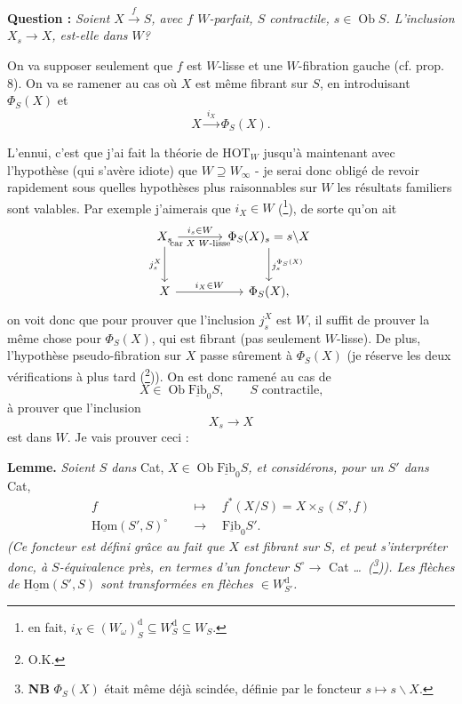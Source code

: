 \documentclass[11pt]{article}
\newcommand{\printedpage}[1]{\marginpar{\footnotesize p.~#1}}
\newcommand{\msp}[1]{\marginpar{\footnotesize [#1]}}
\newcommand{\Ob}{\operatorname{Ob}}
\newcommand{\fl}{\longrightarrow}
\newcommand{\uHom}{\underline{\mathrm{Hom}}}
\newcommand{\uFib}{\underline{\mathrm{Fib}}}
\newcommand{\HOT}{\mathrm{HOT}}
\begin{document}
\textbf{Question :} \textit{Soient $X\xrightarrow{\ f\ }S$, avec $f$ $W$-parfait, $S$ contractile, $s\in\Ob S$. L'inclusion $X_s\fl X$, est-elle dans $W$?}

\printedpage{32}
\msp{page 43}On va supposer seulement que $f$ est $W$-lisse et une $W$-fibration gauche (cf. prop. 8). On va se ramener au cas où $X$ est même fibrant sur $S$, en introduisant $\Phi_S(X)$ et %
\[ X\xrightarrow{\ i_X\ }\Phi_S(X). \]

L'ennui, c'est que j'ai fait la théorie de $\HOT_W$ jusqu'à maintenant avec l'hypothèse (qui s'avère idiote) que $W\supseteq W_\infty$ - je serai donc obligé de revoir rapidement sous quelles hypothèses plus raisonnables sur $W$ les résultats familiers sont valables. Par exemple j'aimerais que $i_X\in W$ (\footnote[50]{en fait, $i_X\in(W_\omega)^{\mathrm{d}}_S\subseteq W^{\mathrm{d}}_S\subseteq W_S$.}), de sorte qu'on ait
\[
\begin{tikzcd}[column sep=large, row sep=large]
X_s \arrow[r, "i_s\in W", "\text{car $X$ $W$-lisse}"'] \arrow[d, "j^X_s"'] & \Phi_S(X)_s=s\backslash X \arrow[d, "j_s^{\Phi_S(X)}"] \\
X \arrow[r, "i_X\in W"] & \Phi_S(X),
\end{tikzcd}
\]
on voit donc que pour prouver que l'inclusion $j^X_s$ est $W$, il suffit de prouver la même chose pour $\Phi_S(X)$, qui est fibrant (pas seulement $W$-lisse). De plus, l'hypothèse pseudo-fibration sur $X$ passe sûrement à $\Phi_S(X)$ (je réserve les deux vérifications à plus tard (\footnote[51]{O.K.})). On est donc ramené au cas de
\[ X\in\Ob\uFib_0S, \qquad S\text{ contractile,} \]
à prouver que l'inclusion
\[ X_s\fl X \]
\msp{page 44}est dans $W$. Je vais prouver ceci :

\textbf{Lemme.} \textit{Soient $S$ dans} Cat, \textit{$X\in\Ob\uFib_0S$, et considérons, pour un $S'$ dans} Cat,
\[
\begin{aligned}
f &\quad\longmapsto\quad f^*(X/S)=X\times_S(S',f)\\
\uHom(S',S)^{\circ} &\quad\longrightarrow\quad \uFib_0S'.
\end{aligned}
\]
\textit{(Ce foncteur est défini grâce au fait que $X$ est fibrant sur $S$, et peut s'interpréter donc, à $S$-équivalence près, en termes d'un foncteur $S^{\circ}\fl$} Cat \textit{\dots\ (\footnote[52]{\textbf{NB} $\Phi_S(X)$ était même déjà scindée, définie par le foncteur $s\longmapsto s\backslash X$.})). Les flèches de $\uHom(S',S)$ sont transformées en flèches $\in W^{\mathrm{d}}_{S'}$.}
\end{document}
